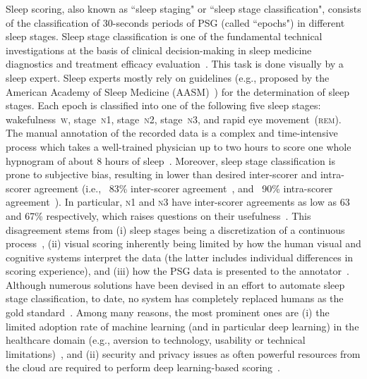 \documentclass[runningheads]{llncs}
\begin{document}
Sleep scoring, also known as ``sleep staging" or ``sleep stage classification", consists of the classification of 30-seconds periods of \textsc{PSG} (called ``epochs") in different sleep stages. 
Sleep stage classification is one of the fundamental technical investigations at the basis of clinical decision-making in sleep medicine diagnostics and treatment efficacy evaluation~\cite{shrivastava2014interpret,wulff2010sleep}.
This task is done visually by a sleep expert. Sleep experts mostly rely on guidelines (e.g., proposed by the American Academy of Sleep Medicine (AASM)~\cite{berry2012rules}) for the determination of sleep stages. Each epoch is classified into one of the following five sleep stages: wakefulness~\textsc{w}, stage~\textsc{n1}, stage~\textsc{n2}, stage~\textsc{n3}, and rapid eye movement~(\textsc{rem}). The manual annotation of the recorded data is a complex and time-intensive process which takes a well-trained physician up to two hours to score one whole hypnogram of about 8 hours of sleep~\cite{malhotra2013performance}. Moreover, sleep stage classification is prone to subjective bias, resulting in lower than desired inter-scorer and intra-scorer agreement (i.e., ~83\% inter-scorer agreement~\cite{rosenberg2013american}, and ~90\% intra-scorer agreement~\cite{fiorillo2019automated}). In particular, \textsc{n1} and \textsc{n3} have inter-scorer agreements as low as 63 and 67\% respectively, which raises questions on their usefulness~\cite{stephansen2018neural}.
This disagreement stems from (i) sleep stages being a discretization of a continuous process~\cite{berthomier2020exploring}, (ii) visual scoring inherently being limited by how the human visual and cognitive systems interpret the data (the latter includes individual differences in scoring experience), and (iii) how the PSG data is presented to the annotator~\cite{silber2007visual}.
Although numerous solutions have been devised in an effort to automate sleep stage classification, to date, no system has completely replaced humans as the gold standard~\cite{fiorillo2021deepsleepnetlite}. Among many reasons, the most prominent ones are (i) the limited adoption rate of machine learning (and in particular deep learning) in the healthcare domain (e.g., aversion to technology, usability or technical limitations)~\cite{fichman2011editorial}, and (ii) security and privacy issues as often powerful resources from the cloud are required to perform deep learning-based scoring~\cite{fiorillo2019automated}.
\end{document}
